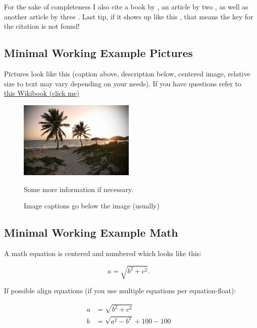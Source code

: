 \documentclass[12pt,a4paper]{article}
\begin{document}
For the sake of completeness I also cite a book by \textcite{Wilkinson2006}, an article by two \textcite{Modigliani1958}, as well as another article by three \textcite{Johnson2000}. Last tip, if it shows up like this \textcite{UnknownKey2000}, that means the key for the citation is not found!

\subsection{Minimal Working Example Pictures}
Pictures look like this (caption above, description below, centered image, relative size to text may vary depending on your needs). If you have questions refer to \href{https://en.wikibooks.org/wiki/LaTeX/Floats,_Figures_and_Captions}{this Wikibook (click me)}

\begin{figure}[h]
\centering
\includegraphics[width=0.5\textwidth]{pictures/beach.jpg} \\
\caption{Image captions go below the image (usually)}
\small Some more information if necessary.
\end{figure}


\subsection{Minimal Working Example Math}
\label{subsec:math}
A math equation is centered and numbered which looks like this:

\begin{equation}
a = \sqrt{b^2 + c^2}.
\end{equation}

If possible align equations (if you use multiple equations per equation-float):

\begin{equation}
\begin{split}
a &= \sqrt{b^2 + c^2}\\
b &= \sqrt{a^2 - b^2} + 100 - 100 
\end{split}
\end{equation}
\end{document}
